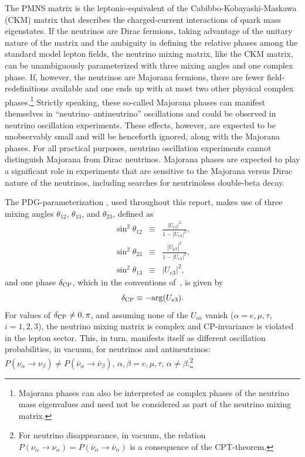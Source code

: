 The PMNS matrix is the leptonic-equivalent of the Cabibbo-Kobayashi-Maskawa (CKM) matrix that describes the charged-current interactions of quark mass eigenstates. If the neutrinos are Dirac fermions, taking advantage of the unitary nature of the matrix and the ambiguity in defining the relative phases among the standard model lepton fields, the neutrino mixing matrix, like the CKM matrix, can be unambiguously parameterized with three mixing angles and one complex phase. If, however, the neutrinos are Majorana fermions, there are fewer field-redefinitions available and one ends up with at most two other physical complex phases.\footnote{Majorana phases can also be interpreted as complex phases of the neutrino mass eigenvalues and need not be considered as part of the neutrino mixing matrix.}  Strictly speaking, these so-called Majorana phases can manifest themselves in ``neutrino--antineutrino'' oscillations \cite{deGouvea:2002gf} and could be observed in neutrino oscillation experiments. These effects, however, are expected to be unobservably small and will be henceforth ignored, along with the Majorana phases. For all practical purposes, neutrino oscillation experiments cannot distinguish Majorana from Dirac neutrinos. Majorana phases are expected to play a significant role in experiments that are sensitive to the Majorana versus Dirac nature of the neutrinos, including searches for neutrinoless double-beta decay. 

The PDG-parameterization \cite{Tanabashi:2018oca}, used throughout this report, makes use of three mixing angles $\theta_{12}$, $\theta_{13}$, and $\theta_{23}$, defined as
\begin{eqnarray}
\sin^2\theta_{12} &\equiv&       \frac{|U_{e2}|^2}{1-|U_{e3}|^2}, \\
\sin^2\theta_{23} &\equiv& \frac{|U_{\mu3}|^2}{1-|U_{e3}|^2}, \\
\sin^2\theta_{13} &\equiv& |U_{e3}|^2,
\end{eqnarray} 
and one phase $\delta_{\rm CP}$, which in the conventions of~\cite{Tanabashi:2018oca}, is given by
\begin{equation}
\delta_{\rm CP} \equiv -{\rm arg}(U_{e3}).
\end{equation}
For values of $\delta_{\rm CP}\neq 0,\pi$, and assuming none of the $U_{\alpha i}$ vanish ($\alpha=e,\mu,\tau$, $i=1,2,3$), the neutrino mixing matrix is complex and CP-invariance is violated in the lepton sector. This, in turn, manifests itself as different oscillation probabilities, in vacuum, for neutrinos and antineutrinos: $P(\nu_{\alpha}\to\nu_{\beta})\neq P(\bar{\nu}_{\alpha}\to\bar{\nu}_{\beta})$, $\alpha,\beta=e,\mu,\tau$, $\alpha\neq\beta$.\footnote{For neutrino disappearance, in vacuum, the relation $P(\nu_{\alpha}\to\nu_{\alpha}) =P(\bar{\nu}_{\alpha}\to\bar{\nu}_{\alpha})$ is a consequence of the CPT-theorem.} 

